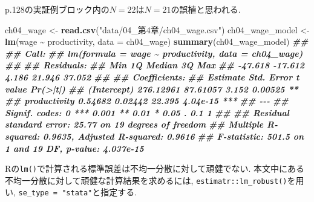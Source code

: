 \documentclass[
]{book}
\newenvironment{Shaded}{\begin{snugshade}}{\end{snugshade}}
\newcommand{\AttributeTok}[1]{\textcolor[rgb]{0.13,0.29,0.53}{#1}}
\newcommand{\DocumentationTok}[1]{\textcolor[rgb]{0.56,0.35,0.01}{\textbf{\textit{#1}}}}
\newcommand{\FunctionTok}[1]{\textcolor[rgb]{0.13,0.29,0.53}{\textbf{#1}}}
\newcommand{\NormalTok}[1]{#1}
\newcommand{\OtherTok}[1]{\textcolor[rgb]{0.56,0.35,0.01}{#1}}
\newcommand{\SpecialCharTok}[1]{\textcolor[rgb]{0.81,0.36,0.00}{\textbf{#1}}}
\newcommand{\StringTok}[1]{\textcolor[rgb]{0.31,0.60,0.02}{#1}}
\begin{document}
p.128の実証例ブロック内の\(N=22\)は\(N=21\)の誤植と思われる.

\begin{Shaded}
\begin{Highlighting}[]
\NormalTok{ch04\_wage }\OtherTok{\textless{}{-}} \FunctionTok{read.csv}\NormalTok{(}\StringTok{"data/04\_第4章/ch04\_wage.csv"}\NormalTok{)}
\NormalTok{ch04\_wage\_model }\OtherTok{\textless{}{-}} \FunctionTok{lm}\NormalTok{(wage }\SpecialCharTok{\textasciitilde{}}\NormalTok{ productivity, }\AttributeTok{data =}\NormalTok{ ch04\_wage)}
\FunctionTok{summary}\NormalTok{(ch04\_wage\_model)}
\DocumentationTok{\#\# }
\DocumentationTok{\#\# Call:}
\DocumentationTok{\#\# lm(formula = wage \textasciitilde{} productivity, data = ch04\_wage)}
\DocumentationTok{\#\# }
\DocumentationTok{\#\# Residuals:}
\DocumentationTok{\#\#     Min      1Q  Median      3Q     Max }
\DocumentationTok{\#\# {-}47.618 {-}17.612   4.186  21.946  37.052 }
\DocumentationTok{\#\# }
\DocumentationTok{\#\# Coefficients:}
\DocumentationTok{\#\#               Estimate Std. Error t value Pr(\textgreater{}|t|)    }
\DocumentationTok{\#\# (Intercept)  276.12961   87.61057   3.152  0.00525 ** }
\DocumentationTok{\#\# productivity   0.54682    0.02442  22.395 4.04e{-}15 ***}
\DocumentationTok{\#\# {-}{-}{-}}
\DocumentationTok{\#\# Signif. codes:  0 \textquotesingle{}***\textquotesingle{} 0.001 \textquotesingle{}**\textquotesingle{} 0.01 \textquotesingle{}*\textquotesingle{} 0.05 \textquotesingle{}.\textquotesingle{} 0.1 \textquotesingle{} \textquotesingle{} 1}
\DocumentationTok{\#\# }
\DocumentationTok{\#\# Residual standard error: 25.77 on 19 degrees of freedom}
\DocumentationTok{\#\# Multiple R{-}squared:  0.9635, Adjusted R{-}squared:  0.9616 }
\DocumentationTok{\#\# F{-}statistic: 501.5 on 1 and 19 DF,  p{-}value: 4.037e{-}15}
\end{Highlighting}
\end{Shaded}

Rの\texttt{lm()}で計算される標準誤差は不均一分散に対して頑健でない.
本文中にある不均一分散に対して頑健な計算結果を求めるには, \texttt{estimatr::lm\_robust()}を用い, \texttt{se\_type\ =\ "stata"}と指定する.
\end{document}
